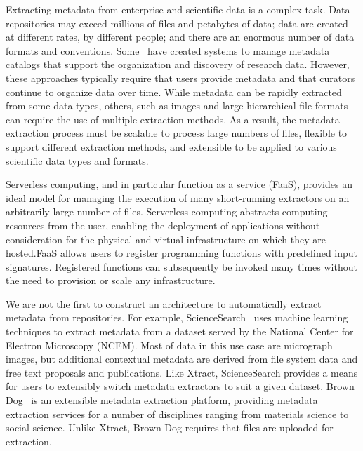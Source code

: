 \documentclass[sigconf]{acmart}
\newcommand{\tyler}[1]{}
\newcommand{\tyler}[1]{{\textcolor{cyan}{ tyler: #1 }}}
\newcommand{\name}{Xtract}
\begin{document}
\tyler{Add note here about the edge}
Extracting metadata from enterprise and scientific data is a complex task. 
Data repositories may exceed millions of files and petabytes of data;
data are created at different rates, by different people; 
and there are an enormous number of data formats and conventions. 
Some~\cite{egan2003vizier, welter2013nhgri, irods, dataverse} have created 
systems to manage metadata catalogs that
support the organization and discovery of research data. However, these approaches typically 
require that users provide metadata and that curators continue to organize data over time.
While metadata can be rapidly extracted from some data types, others, such as
images and large hierarchical file formats can require the use of multiple extraction methods.  
As a result, the metadata extraction process must be scalable to process large numbers
of files, flexible to support different extraction methods, and extensible
to be applied to various scientific data types and formats.

Serverless computing, and in particular function as a service (FaaS),
provides an ideal model for managing the execution of
many short-running extractors on an arbitrarily large number of files. 
Serverless computing abstracts computing resources from the user, enabling
the deployment of applications without consideration for the physical and virtual infrastructure on which 
they are hosted.FaaS allows users to register programming functions with predefined input signatures. 
Registered functions can subsequently be invoked many times
without the need to provision or scale any infrastructure.

\tyler{need to mention the name of our system first}
We are not the first to construct an architecture to automatically extract metadata from repositories. 
For example, ScienceSearch~\cite{rodrigo2018sciencesearch} uses 
machine learning techniques to extract metadata from a dataset served by the National Center for Electron Microscopy (NCEM). 
Most of data in this use case are micrograph images, but additional contextual metadata are derived from file system 
data and free text proposals and publications. Like \name{}, ScienceSearch 
provides a means for users to extensibly switch metadata extractors to suit a given dataset.  
Brown Dog~\cite{padhy2015brown} is an extensible metadata extraction platform, 
providing metadata extraction services for a number of 
disciplines ranging from materials science to social science.
Unlike \name{}, Brown Dog requires that files are uploaded for extraction. 
\end{document}
